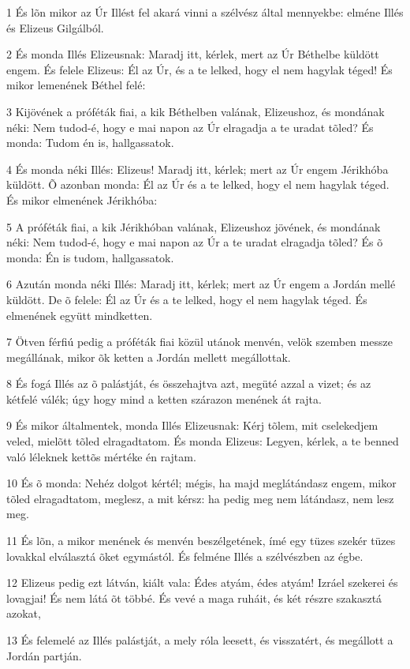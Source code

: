 \par 1 És lõn mikor az Úr Illést fel akará vinni a szélvész által mennyekbe: elméne Illés és Elizeus Gilgálból.
\par 2 És monda Illés Elizeusnak: Maradj itt, kérlek, mert az Úr Béthelbe küldött engem. És felele Elizeus: Él az Úr, és a te lelked, hogy el nem hagylak téged! És mikor lemenének Béthel felé:
\par 3 Kijövének a próféták fiai, a kik Béthelben valának, Elizeushoz, és mondának néki: Nem tudod-é, hogy e mai napon az Úr elragadja a te uradat tõled? És monda: Tudom én is, hallgassatok.
\par 4 És monda néki Illés: Elizeus! Maradj itt, kérlek; mert az Úr engem Jérikhóba küldött. Õ azonban monda: Él az Úr és a te lelked, hogy el nem hagylak téged. És mikor elmenének Jérikhóba:
\par 5 A próféták fiai, a kik Jérikhóban valának, Elizeushoz jövének, és mondának néki: Nem tudod-é, hogy e mai napon az Úr a te uradat elragadja tõled? És õ monda: Én is tudom, hallgassatok.
\par 6 Azután monda néki Illés: Maradj itt, kérlek; mert az Úr engem a Jordán mellé küldött. De õ felele: Él az Úr és a te lelked, hogy el nem hagylak téged. És elmenének együtt mindketten.
\par 7 Ötven férfiú pedig a próféták fiai közül utánok menvén, velök szemben messze megállának, mikor õk ketten a Jordán mellett megállottak.
\par 8 És fogá Illés az õ palástját, és összehajtva azt, megüté azzal a vizet; és az kétfelé válék; úgy hogy mind a ketten szárazon menének át rajta.
\par 9 És mikor általmentek, monda Illés Elizeusnak: Kérj tõlem, mit cselekedjem veled, mielõtt tõled elragadtatom. És monda Elizeus: Legyen, kérlek, a te benned való léleknek kettõs mértéke én rajtam.
\par 10 És õ monda: Nehéz dolgot kértél; mégis, ha majd meglátándasz engem, mikor tõled elragadtatom, meglesz, a mit kérsz: ha pedig meg nem látándasz, nem lesz meg.
\par 11 És lõn, a mikor menének és menvén beszélgetének, ímé egy tüzes szekér tüzes lovakkal elválasztá õket egymástól. És felméne Illés a szélvészben az égbe.
\par 12 Elizeus pedig ezt látván, kiált vala: Édes atyám, édes atyám! Izráel szekerei és lovagjai! És nem látá õt többé. És vevé a maga ruháit, és két részre szakasztá azokat,
\par 13 És felemelé az Illés palástját, a mely róla leesett, és visszatért, és megállott a Jordán partján.
